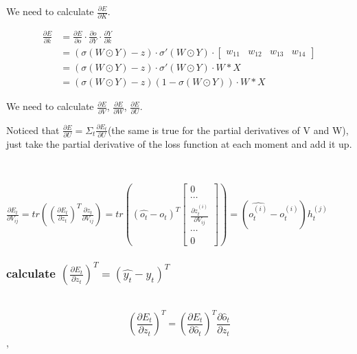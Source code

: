 \documentclass[oneside,solution]{seu-ml-assign}
\begin{document}
We need to calculate $\frac{\partial E}{\partial K}$.

\begin{equation}
  \begin{aligned}
    \frac{\partial E}{\partial k} & = \frac{\partial E}{\partial o} \cdot \frac{\partial o}{\partial Y} \cdot \frac{\partial Y}{\partial k}                               \\
                                  & = \left(  \sigma(W \odot Y) - z\right) \cdot \sigma'(W \odot Y) \cdot \begin{bmatrix} w_{11} & w_{12} & w_{13} & w_{14} \end{bmatrix} \\
                                  & = \left(  \sigma(W \odot Y) - z\right) \cdot \sigma'(W \odot Y) \cdot W \ast X                                                        \\
                                  & = \left(  \sigma(W \odot Y) - z\right) (1 - \sigma(W \odot Y)) \cdot W \ast X
  \end{aligned}
\end{equation}






We need to calculate $\frac{\partial E }{ \partial V }$, $\frac{\partial E }{ \partial W }$, $\frac{\partial E }{ \partial U }$.

Noticed that $\frac{\partial E}{\partial U}=\Sigma_t\frac{\partial E_t}{\partial U}$(the same is true for the partial derivatives of V and W),
just take the partial derivative of the loss function at each moment and add it up.

\

$\frac{\partial E_t}{\partial V_{ij}}=tr((\frac{\partial E_t}{\partial z_t})^T\frac{\partial z_t}{\partial V_{ij}})=tr((\hat{o_t}-o_t)^T\begin{bmatrix}0\\\cdots\\\frac{\partial z_t^{(i)}}{\partial V_{ij}}\\\cdots\\0\end{bmatrix})=(\hat{o_t^{(i)}}-o_t^{(i)})h_t^{(j)}$


\subsubsection{calculate $(\frac{\partial E_{t}}{\partial z_{t}})^{T}=(\hat{y_{t}}-y_{t})^{T}$}
\
\[
  \left(\frac{\partial E_t}{\partial z_t}\right)^T = \left(\frac{\partial E_t}{\partial \hat{o}_t}\right)^T \frac{\partial \hat{o}_t}{\partial z_t}
\],
\end{document}
